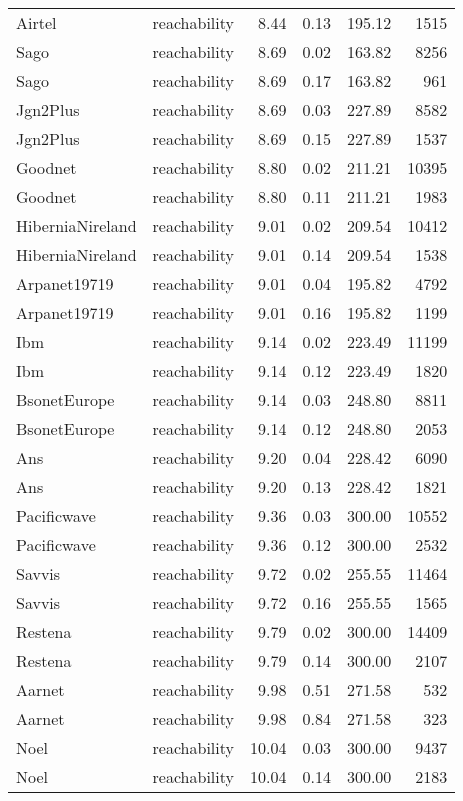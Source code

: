 \begin{tabular}{llrrrr}
Airtel & reachability & 8.44 & 0.13 & 195.12 & 1515 \\
Sago & reachability & 8.69 & 0.02 & 163.82 & 8256 \\
Sago & reachability & 8.69 & 0.17 & 163.82 & 961 \\
Jgn2Plus & reachability & 8.69 & 0.03 & 227.89 & 8582 \\
Jgn2Plus & reachability & 8.69 & 0.15 & 227.89 & 1537 \\
Goodnet & reachability & 8.80 & 0.02 & 211.21 & 10395 \\
Goodnet & reachability & 8.80 & 0.11 & 211.21 & 1983 \\
HiberniaNireland & reachability & 9.01 & 0.02 & 209.54 & 10412 \\
HiberniaNireland & reachability & 9.01 & 0.14 & 209.54 & 1538 \\
Arpanet19719 & reachability & 9.01 & 0.04 & 195.82 & 4792 \\
Arpanet19719 & reachability & 9.01 & 0.16 & 195.82 & 1199 \\
Ibm & reachability & 9.14 & 0.02 & 223.49 & 11199 \\
Ibm & reachability & 9.14 & 0.12 & 223.49 & 1820 \\
BsonetEurope & reachability & 9.14 & 0.03 & 248.80 & 8811 \\
BsonetEurope & reachability & 9.14 & 0.12 & 248.80 & 2053 \\
Ans & reachability & 9.20 & 0.04 & 228.42 & 6090 \\
Ans & reachability & 9.20 & 0.13 & 228.42 & 1821 \\
Pacificwave & reachability & 9.36 & 0.03 & 300.00 & 10552 \\
Pacificwave & reachability & 9.36 & 0.12 & 300.00 & 2532 \\
Savvis & reachability & 9.72 & 0.02 & 255.55 & 11464 \\
Savvis & reachability & 9.72 & 0.16 & 255.55 & 1565 \\
Restena & reachability & 9.79 & 0.02 & 300.00 & 14409 \\
Restena & reachability & 9.79 & 0.14 & 300.00 & 2107 \\
Aarnet & reachability & 9.98 & 0.51 & 271.58 & 532 \\
Aarnet & reachability & 9.98 & 0.84 & 271.58 & 323 \\
Noel & reachability & 10.04 & 0.03 & 300.00 & 9437 \\
Noel & reachability & 10.04 & 0.14 & 300.00 & 2183 \\

\end{tabular}

